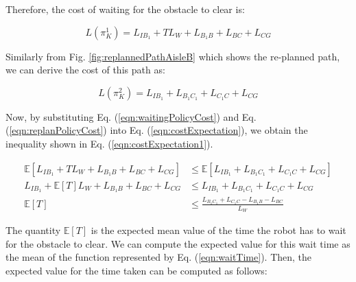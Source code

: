 \documentclass[a4paper,12pt]{article}
\begin{document}
			Therefore, the cost of waiting for the obstacle to clear is:
			
			\begin{equation}
			L\left(\pi_{K}^{1}\right) = L_{IB_{1}} + TL_W + L_{B_{1}B} + L_{BC} + L_{CG}
			\label{eqn:waitingPolicyCost}
			\end{equation}
			
			Similarly from Fig. \ref{fig:replannedPathAisleB} which shows the re-planned path, we can derive the cost of this path as:
			
			\begin{equation}
			L\left(\pi_{K}^{2}\right) = L_{IB_{1}} + L_{B_{1}C_{1}} + L_{C_{1}C} + L_{CG}
			\label{eqn:replanPolicyCost}
			\end{equation}
			
			Now, by substituting Eq. (\ref{eqn:waitingPolicyCost}) and Eq. (\ref{eqn:replanPolicyCost}) into Eq. (\ref{eqn:costExpectation}), we obtain the inequality shown in Eq. (\ref{eqn:costExpectation1}).
			
			\begin{equation}
			\begin{split}
			\mathbb{E}\left[L_{IB_{1}} + TL_W + L_{B_{1}B} + L_{BC} + L_{CG}\right] & \leq \mathbb{E}\left[L_{IB_{1}} + L_{B_{1}C_{1}} + L_{C_{1}C} + L_{CG}\right] \\
			L_{IB_{1}} + \mathbb{E}\left[T\right] L_W + L_{B_{1}B} + L_{BC} + L_{CG} & \leq L_{IB_{1}} + L_{B_{1}C_{1}} + L_{C_{1}C} + L_{CG} \\
			\mathbb{E}\left[T\right] & \leq \frac{L_{B_{1}C_{1}} + L_{C_{1}C} - L_{B_{1}B} - L_{BC}}{L_W}
			\end{split}
			\label{eqn:costExpectation1}
			\end{equation}
			
			The quantity $\mathbb{E}\left[T\right]$ is the expected mean value of the time the robot has to wait for the obstacle to clear. We can compute the expected value for this wait time as the mean of the function represented by Eq. (\ref{eqn:waitTime}). Then, the expected value for the time taken can be computed as follows:
			
\end{document}
